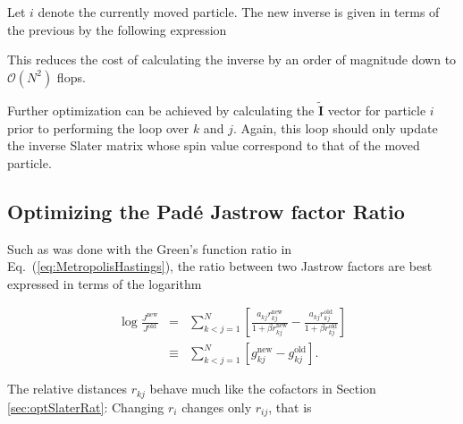 Let $i$ denote the currently moved particle. The new inverse is given in terms of the previous by the following expression \cite{abInitioMC, morten}


This reduces the cost of calculating the inverse by an order of magnitude down to $\mathcal{O}(N^2)$ flops.

Further optimization can be achieved by calculating the $\mathbf{\tilde I}$ vector for particle $i$ prior to performing the loop over $k$ and $j$. Again, this loop should only update the inverse Slater matrix whose spin value correspond to that of the moved particle.

\subsection{Optimizing the Padé Jastrow factor Ratio}
\label{sec:optPagejastRat}

Such as was done with the Green's function ratio in Eq.~(\ref{eq:MetropolisHastings}), the ratio between two Jastrow factors are best expressed in terms of the logarithm

\begin{eqnarray}
 \log \frac{J^\mathrm{new}}{J^\mathrm{old}} &=& \sum_{k<j = 1}^N \left[\frac{a_{kj}r^\mathrm{new}_{kj}}{1 + \beta r^\mathrm{new}_{kj}} - \frac{a_{kj}r^\mathrm{old}_{kj}}{1 + \beta r^\mathrm{old}_{kj}}\right] \\
                      &\equiv& \sum_{k<j = 1}^N \left[g^\mathrm{new}_{kj} - g^\mathrm{old}_{kj}\right]. \label{eq:jastrowRatSTD}
\end{eqnarray}

The relative distances $r_{kj}$ behave much like the cofactors in Section \ref{sec:optSlaterRat}: Changing $r_i$ changes only $r_{ij}$, that is

